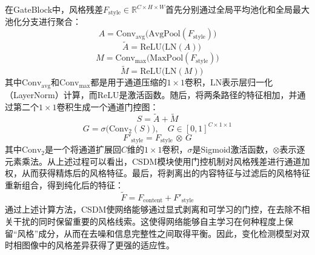 在GateBlock中，风格残差$F_{\mathrm{style}}\in\mathbb{R}^{C\times H\times W}$首先分别通过全局平均池化和全局最大池化分支进行聚合：
\begin{equation}
A = \mathrm{Conv}_{\mathrm{avg}}\bigl(\mathrm{AvgPool}(F_{\mathrm{style}})\bigr)
\end{equation}
\begin{equation}
\quad\tilde A = \mathrm{ReLU}\bigl(\mathrm{LN}(A)\bigr)
\end{equation}
\begin{equation}
M = \mathrm{Conv}_{\mathrm{max}}\bigl(\mathrm{MaxPool}(F_{\mathrm{style}})\bigr)
\end{equation}
\begin{equation}
\quad\tilde M = \mathrm{ReLU}\bigl(\mathrm{LN}(M)\bigr)
\end{equation}
其中$\mathrm{Conv}_{\mathrm{avg}}$和$\mathrm{Conv}_{\mathrm{max}}$都是用于通道压缩的$1\times1$卷积，$\mathrm{LN}$表示层归一化（LayerNorm）计算，而$\mathrm{ReLU}$是激活函数。随后，将两条路径的特征相加，并通过第二个$1\times1$卷积生成一个通道门控图：
\begin{equation}
S = \tilde A + \tilde M
\end{equation}
\begin{equation}
G = \sigma\bigl(\mathrm{Conv}_2(S)\bigr),\quad G\in[0,1]^{C\times1\times1}
\end{equation}
\begin{equation}
F'_{\mathrm{style}} = F_{\mathrm{style}} \,\otimes\, G
\end{equation}
其中$\mathrm{Conv}_2$是一个将通道扩展回$C$维的$1\times1$卷积，$\sigma$是Sigmoid激活函数，$\otimes$表示逐元素乘法。从上述过程可以看出，CSDM模块使用门控机制对风格残差进行通道加权，从而获得精炼后的风格特征。最后，将剥离出的内容特征与过滤后的风格特征重新组合，得到纯化后的特征：
\begin{equation}
\tilde F = F_{\mathrm{content}} + F'_{\mathrm{style}}
\end{equation}
通过上述计算方法，CSDM使网络能够通过显式剥离和可学习的门控，在去除不相关干扰的同时保留重要的风格线索。这使得网络能够自主学习在何种程度上保留“风格”成分，从而在去噪和信息完整性之间取得平衡。因此，变化检测模型对双时相图像中的风格差异获得了更强的适应性。



